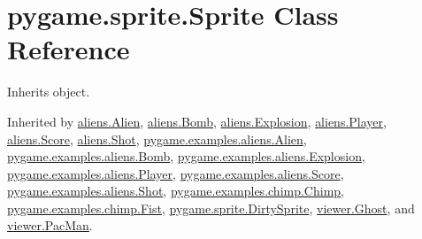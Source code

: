 \hypertarget{classpygame_1_1sprite_1_1_sprite}{}\section{pygame.\+sprite.\+Sprite Class Reference}
\label{classpygame_1_1sprite_1_1_sprite}


Inherits object.



Inherited by \hyperlink{classaliens_1_1_alien}{aliens.\+Alien}, \hyperlink{classaliens_1_1_bomb}{aliens.\+Bomb}, \hyperlink{classaliens_1_1_explosion}{aliens.\+Explosion}, \hyperlink{classaliens_1_1_player}{aliens.\+Player}, \hyperlink{classaliens_1_1_score}{aliens.\+Score}, \hyperlink{classaliens_1_1_shot}{aliens.\+Shot}, \hyperlink{classpygame_1_1examples_1_1aliens_1_1_alien}{pygame.\+examples.\+aliens.\+Alien}, \hyperlink{classpygame_1_1examples_1_1aliens_1_1_bomb}{pygame.\+examples.\+aliens.\+Bomb}, \hyperlink{classpygame_1_1examples_1_1aliens_1_1_explosion}{pygame.\+examples.\+aliens.\+Explosion}, \hyperlink{classpygame_1_1examples_1_1aliens_1_1_player}{pygame.\+examples.\+aliens.\+Player}, \hyperlink{classpygame_1_1examples_1_1aliens_1_1_score}{pygame.\+examples.\+aliens.\+Score}, \hyperlink{classpygame_1_1examples_1_1aliens_1_1_shot}{pygame.\+examples.\+aliens.\+Shot}, \hyperlink{classpygame_1_1examples_1_1chimp_1_1_chimp}{pygame.\+examples.\+chimp.\+Chimp}, \hyperlink{classpygame_1_1examples_1_1chimp_1_1_fist}{pygame.\+examples.\+chimp.\+Fist}, \hyperlink{classpygame_1_1sprite_1_1_dirty_sprite}{pygame.\+sprite.\+Dirty\+Sprite}, \hyperlink{classviewer_1_1_ghost}{viewer.\+Ghost}, and \hyperlink{classviewer_1_1_pac_man}{viewer.\+Pac\+Man}.

